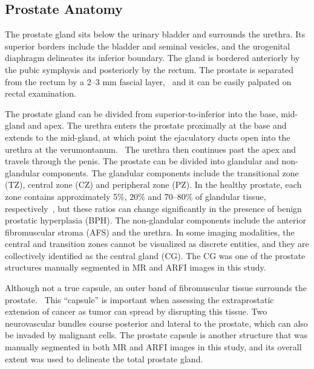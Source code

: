 ﻿\subsection{Prostate Anatomy}
The prostate gland sits below the urinary bladder and surrounds the urethra.
Its superior borders include the bladder and seminal vesicles, and the
urogenital diaphragm delineates its inferior boundary. The gland is bordered
anteriorly by the pubic symphysis and posteriorly by the rectum.  The prostate
is separated from the rectum by a 2--3 mm fascial layer,~\cite{Jung2012} and it
can be easily palpated on rectal examination. 

The prostate gland can be divided from superior-to-inferior into the base,
mid-gland and apex. The urethra enters the prostate proximally at the base and
extends to the mid-gland, at which point the ejaculatory ducts open into the
urethra at the verumontanum.~\cite{Jung2012} The urethra then continues past
the apex and travels through the penis. The prostate can be divided into
glandular and non-glandular components.  The glandular components include the
transitional zone (TZ), central zone (CZ) and peripheral zone (PZ). In the
healthy prostate, each zone contains approximately 5\%, 20\% and 70--80\% of
glandular tissue, respectively~\cite{Bonekamp2011}, but these ratios can
change significantly in the presence of benign prostatic hyperplasia (BPH). The
non-glandular components include the anterior fibromuscular stroma (AFS) and
the urethra.  In some imaging modalities, the central and transition zones
cannot be visualized as discrete entities, and they are collectively identified
as the central gland (CG).  The CG was one of the prostate structures manually
segmented in MR and ARFI images in this study.

Although not a true capsule, an outer band of fibromuscular tissue surrounds
the prostate.~\cite{Bonekamp2011} This ``capsule'' is important when assessing
the extraprostatic extension of cancer as tumor can spread by disrupting this
tissue. Two neurovascular bundles course posterior and lateral to the prostate,
which can also be invaded by malignant cells.  The prostate capsule is another
structure that was manually segmented in both MR and ARFI images in this study,
and its overall extent was used to delineate the total prostate gland.
